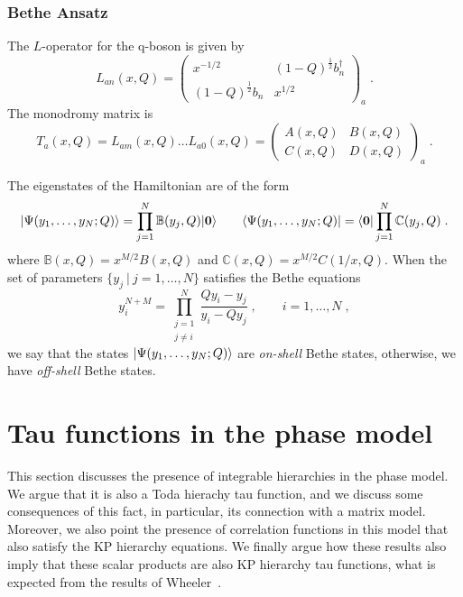 \documentclass[a4paper,11pt]{amsart}
\begin{document}
\subsubsection{Bethe Ansatz}
The \(L\)-operator for the q-boson is given by
\begin{equation}
  L_{an}(x, Q) =
  \begin{pmatrix}
    x^{-1/2} & (1 - Q)^{\frac{1}{2}} b_n^\dagger \\ (1 - Q)^{\frac{1}{2}} b_n & x^{1/2}
  \end{pmatrix}_a\; .
\end{equation}
The monodromy matrix is 
\begin{equation}
  T_a(x,Q) = L_{am}(x, Q)  \dots  L_{a0}(x, Q) = 
  \begin{pmatrix}
    A(x, Q) & B(x, Q) \\ C(x, Q) & D(x, Q)
  \end{pmatrix}_a\; .
\end{equation}

The eigenstates of the Hamiltonian are of the form
\begin{equation}
  \lvert\Psi(y_1, \dots, y_N; Q)\rangle = \prod_{j=1}^N \mathbb{B}(y_j, Q) \lvert\bm{0}\rangle\qquad 
  \langle\Psi(y_1, \dots, y_N; Q)\rvert = \langle\bm{0}\rvert\prod_{j=1}^N \mathbb{C}(y_j, Q) \; .
\end{equation}
where \(\mathbb{B}(x, Q) = x^{M/2} B(x, Q)\) and \(\mathbb{C}(x, Q) =
x^{M/2} C(1/x, Q)\).  When the set of parameters \(\{ y_j \ | \ j =1, \dots , N\}\)
satisfies the Bethe equations
\begin{equation}
  y^{N + M}_i =\prod_{\substack{j = 1 \\ j \neq i}}^N\frac{Q y_i - y_j}{y_i - Q y_j}\; , \qquad i = 1, \dots, N\; , 
\end{equation}
we say that the states \(\lvert\Psi(y_1, \dots, y_N; Q)\rangle\) are \emph{on-shell} Bethe states, otherwise, 
we have \emph{off-shell} Bethe states. 


\section{Tau functions in the phase model}

This section discusses the presence of integrable hierarchies in the phase
model.  We argue that it is also a Toda hierachy tau function, and we
discuss some consequences of this fact, in particular, its connection
with a matrix model. Moreover, we also point the presence of
correlation functions in this model that also satisfy the KP hierarchy
equations. We finally argue how these results also imply that these
scalar products are also KP hierarchy tau functions, what is expected from 
the results of Wheeler~\cite{Wheeler:2010vmq}.
\end{document}
